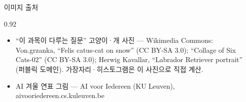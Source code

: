 \begin{frame}{이미지 출처}
\begin{center}\begin{varwidth}{0.92\textwidth}
  \scriptsize
  \begin{itemize}
    \item ``이 과목이 다루는 질문'' 고양이·개 사진 --- Wikimedia Commons: Von.grzanka, ``Felis catus-cat on snow'' (CC BY-SA 3.0); ``Collage of Six Cats-02'' (CC BY-SA 3.0); Herwig Kavallar, ``Labrador Retriever portrait'' (퍼블릭 도메인). 가장자리·히스토그램은 이 사진으로 직접 계산.
    \item AI 겨울 연표 그림 --- AI voor Iedereen (KU Leuven), aivooriedereen.cs.kuleuven.be
  \end{itemize}
\end{varwidth}\end{center}
\end{frame}
